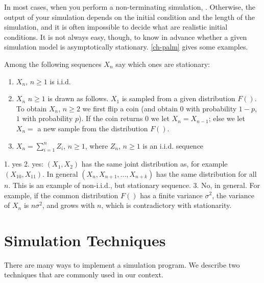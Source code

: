 In most cases, when you perform a non-terminating simulation,
. Otherwise, the output of your simulation depends on
the initial condition and the length of the simulation, and it
is often impossible to decide what are realistic initial
conditions. It is not always easy, though, to know in advance
whether a given simulation model is asymptotically stationary.
\cref{ch-palm} gives some examples.
%
%
 {Among the following sequences $X_n$ say which ones are
 stationary:
 \begin{enumerate}
 \item $X_n$, $n \geq 1$ is i.i.d.
 \item $X_n$ $n \geq 1$ is drawn as follows. $X_1$ is sampled from a
 given distribution $F()$. To obtain $X_n$, $n \geq 2$ we first flip a coin
 (and obtain $0$ with probability $1-p$, $1$ with probability $p$).
 If the coin returns $0$ we let $X_n=X_{n-1}$; else we let $X_n=$ a new
 sample from the distribution $F()$.
 \item $X_n= \sum_{i=1}^n Z_i$, $n \geq 1$, where $Z_n$, $n
     \geq 1$ is an i.i.d. sequence
 \end{enumerate}
 }
 {1. yes 2. yes: $(X_1,X_2)$ has the same joint distribution as, for example $(X_{10},X_{11})$.  In general
 $(X_{n},X_{n+1},...,X_{n+k})$ has the same distribution for all $n$. This is an example of non-i.i.d., but stationary sequence.
 3. No, in general. For example, if the common
 distribution $F()$ has a finite variance $\sigma^2$,  the variance of $X_n$ is $n \sigma^2$, and grows with $n$, which is contradictory with
 stationarity.}
\section{Simulation Techniques}
There are many ways to implement a simulation program. We
describe two techniques that are commonly used in our context.

